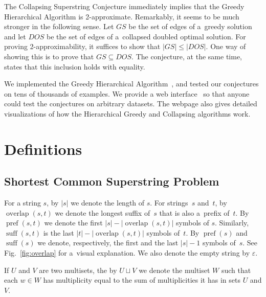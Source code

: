 \documentclass[11pt]{article}
\DeclareMathOperator{\overlap}{overlap}
\DeclareMathOperator{\pref}{pref}
\DeclareMathOperator{\suff}{suff}
\begin{document}
The Collapsing Superstring Conjecture immediately implies that the Greedy
Hierarchical Algorithm is 2-approximate. Remarkably, it seems to be much
stronger in the following sense. Let $GS$ be the set of edges of a~greedy
solution and let $DOS$ be the set of edges of a~collapsed doubled optimal
solution. For proving 2-approximability, it suffices to show that $|GS| \le |DOS|$. 
One way of showing this is to prove that $GS \subseteq DOS$. 
The conjecture, at the same time, states that this inclusion holds with equality.

We implemented the Greedy Hierarchical Algorithm~\cite{github}, and tested our conjectures on tens of thousands of examples. We provide a web interface~\cite{webpage} so that anyone could test the conjectures on arbitrary datasets. The webpage also gives detailed visualizations of how the Hierarchical Greedy and Collapsing algorithms work.

\section{Definitions}
\subsection{Shortest Common Superstring Problem}
\label{sec:def_scs}
For a string $s$, by $|s|$ we denote the length of $s$. 
For strings~$s$ and~$t$, by $\overlap(s,t)$
we denote the longest suffix of~$s$ that is also 
a~prefix of~$t$. By $\pref(s,t)$
we denote the first $|s|-|\overlap(s,t)|$ symbols of $s$.
Similarly, $\suff(s,t)$ is the last
$|t|-|\overlap(s,t)|$ symbols of~$t$. 
By $\pref(s)$ and $\suff(s)$ we denote, respectively,
the first and the last $|s|-1$ symbols of~$s$. See Fig.~\ref{fig:overlap} for a~visual explanation. We also denote the empty string by $\varepsilon$.

If $U$ and $V$ are two multisets, the by $U\sqcup V$ we denote the multiset $W$ such that each $w\in W$ has multiplicity equal to the sum of multiplicities it has in sets $U$ and $V$.
\end{document}
